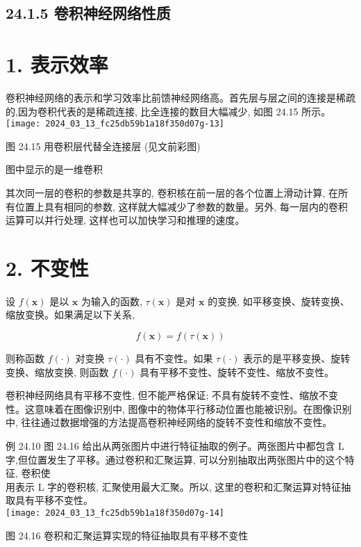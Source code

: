 \documentclass[10pt]{article}
\begin{document}
\subsection*{24.1.5 卷积神经网络性质}
\section*{1. 表示效率}
卷积神经网络的表示和学习效率比前馈神经网络高。首先层与层之间的连接是稀疏的,因为卷积代表的是稀疏连接, 比全连接的数目大幅减少, 如图 24.15 所示。\\
\texttt{[image: 2024\_03\_13\_fc25db59b1a18f350d07g-13]}

图 24.15 用卷积层代替全连接层 (见文前彩图)

图中显示的是一维卷积

其次同一层的卷积的参数是共享的, 卷积核在前一层的各个位置上滑动计算, 在所有位置上具有相同的参数, 这样就大幅减少了参数的数量。另外, 每一层内的卷积运算可以并行处理, 这样也可以加快学习和推理的速度。

\section*{2. 不变性}
设 $f(\boldsymbol{x})$ 是以 $\boldsymbol{x}$ 为输入的函数, $\tau(\boldsymbol{x})$ 是对 $\boldsymbol{x}$ 的变换, 如平移变换、旋转变换、缩放变换。如果满足以下关系,


\begin{equation*}
f(\boldsymbol{x})=f(\tau(\boldsymbol{x})) \tag{24.18}
\end{equation*}


则称函数 $f(\cdot)$ 对变换 $\tau(\cdot)$ 具有不变性。如果 $\tau(\cdot)$ 表示的是平移变换、旋转变换、缩放变换, 则函数 $f(\cdot)$ 具有平移不变性、旋转不变性、缩放不变性。

卷积神经网络具有平移不变性, 但不能严格保证; 不具有旋转不变性、缩放不变性。这意味着在图像识别中, 图像中的物体平行移动位置也能被识别。在图像识别中, 往往通过数据增强的方法提高卷积神经网络的旋转不变性和缩放不变性。

例 24.10 图 24.16 给出从两张图片中进行特征抽取的例子。两张图片中都包含 $\mathrm{L}$ 字,但位置发生了平移。通过卷积和汇聚运算, 可以分别抽取出两张图片中的这个特征, 卷积使\\
用表示 L 字的卷积核, 汇聚使用最大汇聚。所以, 这里的卷积和汇聚运算对特征抽取具有平移不变性。\\
\texttt{[image: 2024\_03\_13\_fc25db59b1a18f350d07g-14]}

图 24.16 卷积和汇聚运算实现的特征抽取具有平移不变性
\end{document}
